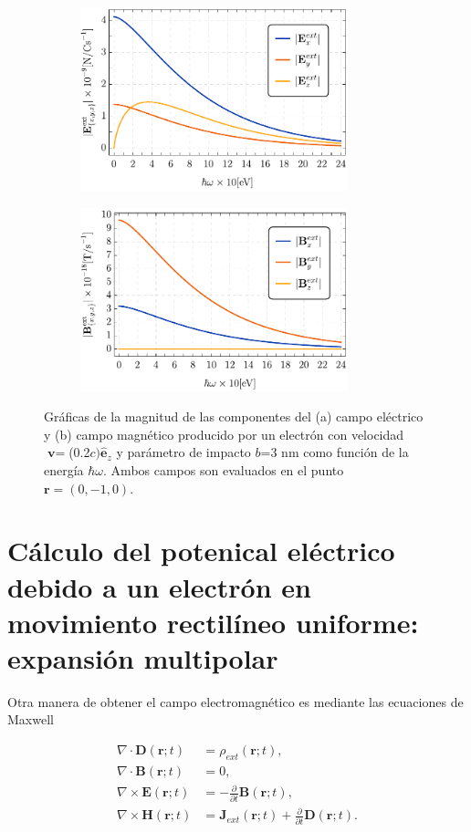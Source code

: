 \documentclass[a4paper,10pt]{article}
\newcommand{\hatbf}[1] {\hat{\mathbf{#1}}}	%
\begin{document}
\begin{figure}[htbp]
\begin{subfigure}[b]{0.5\textwidth}
\caption{}
\end{subfigure}
\begin{subfigure}[b]{0.5\textwidth}
\includegraphics[width=220pt]{EextGraph7.pdf}
\caption{}
\end{subfigure}
\begin{subfigure}[b]{0.5\textwidth}
\includegraphics[width=220pt]{BextGraph7.pdf}
\caption{}
\end{subfigure}
\caption{Gráficas de la magnitud de las componentes del (a) campo eléctrico y (b) campo magnético producido por un electrón con velocidad $\textbf{v}=$(0.2$c)\hatbf{e}_z$ y parámetro de impacto $b$=3 nm como función de la energía $\hbar\omega$. Ambos campos son evaluados en el punto $\textbf{r}=(0,-1,0)$. }
\end{figure}

\section{\large{Cálculo del potenical eléctrico debido a un electrón en movimiento rectilíneo uniforme: expansión multipolar}}

\setcounter{equation}{0}

Otra manera de obtener el campo electromagnético es mediante las ecuaciones de Maxwell

\begin{subequations}
\begin{align}
\nabla\cdot\textbf{D}(\textbf{r};t)	&=\rho_{ext}(\textbf{r};t),	\label{GaussE}	\\
\nabla\cdot\textbf{B}(\textbf{r};t)	&=0,		\label{GaussM}	\\
\nabla\times\textbf{E}(\textbf{r};t)	&= -\frac{\partial}{\partial t}\textbf{B}(\textbf{r};t),	\label{FaradayLenz}	\\
\nabla\times\textbf{H}(\textbf{r};t)	&=\textbf{J}_{ext}(\textbf{r};t)+\frac{\partial}{\partial t}\textbf{D}(\textbf{r};t).	\label{AmpereMaxwell}
\end{align}
\label{EcsMaxwell}
\end{subequations}
\end{document}
